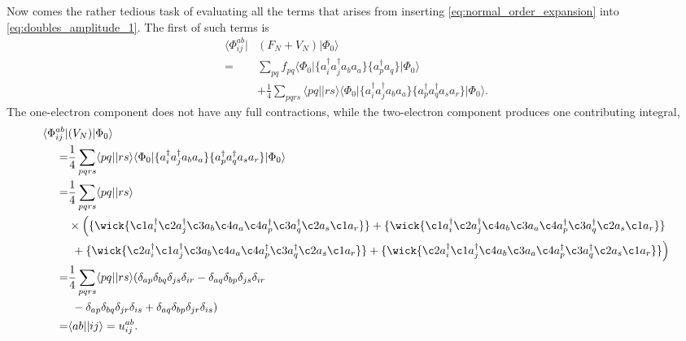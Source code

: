 \documentclass[
    a4paper, aps, twocolumn, floatfix, superscriptaddress,
    nofootinbib]{revtex4-1}
\newcommand{\1}{\mathds{1}}
\newcommand{\bra}[1]{\langle #1\lvert}
\newcommand{\ket}[1]{\rvert #1\rangle}
\begin{document}
		Now comes the rather tedious task of evaluating all the terms 
		that arises from inserting \autoref{eq:normal_order_expansion}
		into \autoref{eq:doubles_amplitude_1}. The first of such terms
		is
		\begin{equation}
		\begin{aligned}
			\bra{\Phi_{ij}^{ab}} &(F_N + V_N)\ket{\Phi_0} \\
			 =& \sum_{pq}f_{pq}\bra{\Phi_0}\{a_i^\dagger a_j^\dagger a_ba_a\}\{a^\dagger_pa_q\}\ket{\Phi_0} \\
			 &+\frac{1}{4}\sum_{pqrs}\bra{pq}\ket{rs}
			 \bra{\Phi_0}\{a_i^\dagger a_j^\dagger a_ba_a\}\{a^\dagger_pa^\dagger_qa_sa_r\}\ket{\Phi_0}.
		\end{aligned}
		\end{equation}
		The one-electron component does not have any full contractions, while the
		two-electron component produces one contributing integral,
		\begin{equation}
		\begin{aligned}
			\bra{\Phi_{ij}^{ab}} &(V_N)\ket{\Phi_0} \\
				=& \frac{1}{4}\sum_{pqrs}\bra{pq}\ket{rs}
			 \bra{\Phi_0}\{a_i^\dagger a_j^\dagger a_ba_a\}\{a^\dagger_pa^\dagger_qa_sa_r\}\ket{\Phi_0} \\
			 	=& \frac{1}{4} \sum_{pqrs} \bra{pq}\ket{rs} \\ &\times\Big(
			 		\{ \wick{\c1 a^\dagger_i \c2 a^\dagger_j \c3 a_b \c4 a_a
			 		\c4 a^\dagger_p \c3 a^\dagger_q \c2 a_s \c1 a_r}\}
			 		+
			 		\{ \wick{\c1 a^\dagger_i \c2 a^\dagger_j \c4 a_b \c3 a_a
			 		\c4 a^\dagger_p \c3 a^\dagger_q \c2 a_s \c1 a_r}\} \\
			 	  &\ +
			 	 	\{ \wick{\c2 a^\dagger_i \c1 a^\dagger_j \c3 a_b \c4 a_a
			 		\c4 a^\dagger_p \c3 a^\dagger_q \c2 a_s \c1 a_r}\}
			 		+
			 		\{ \wick{\c2 a^\dagger_i \c1 a^\dagger_j \c4 a_b \c3 a_a
			 		\c4 a^\dagger_p \c3 a^\dagger_q \c2 a_s \c1 a_r}\}
			 	\Big) \\
			 	=&  \frac{1}{4} \sum_{pqrs} \bra{pq}\ket{rs} 
			 	( \delta_{ap}\delta_{bq}\delta_{js}\delta_{ir}
			 	 -\delta_{aq}\delta_{bp}\delta_{js}\delta_{ir} \\
			     &\ -\delta_{ap}\delta_{bq}\delta_{jr}\delta_{is}
			 	 +\delta_{aq}\delta_{bp}\delta_{jr}\delta_{is}) \\
			 	 =& \bra{ab}\ket{ij} = u^{ab}_{ij}.
		\end{aligned}
		\end{equation}
		
\end{document}
